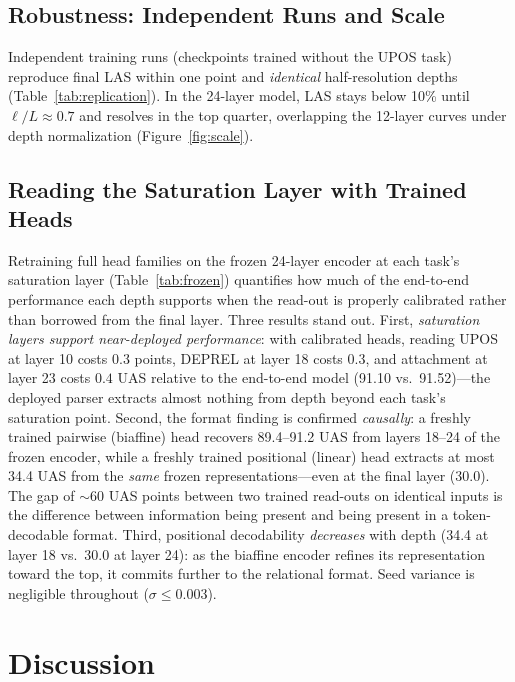 \documentclass[letterpaper]{article}
\begin{document}
\subsection{Robustness: Independent Runs and Scale}
Independent training runs (checkpoints trained without the UPOS task)
reproduce final LAS within one point and \emph{identical} half-resolution
depths (Table~\ref{tab:replication}). In the 24-layer model, LAS stays below
10\% until $\ell/L \approx 0.7$ and resolves in the top quarter, overlapping
the 12-layer curves under depth normalization (Figure~\ref{fig:scale}).

\subsection{Reading the Saturation Layer with Trained Heads}
\label{sec:frozen}
Retraining full head families on the frozen 24-layer encoder at each task's
saturation layer (Table~\ref{tab:frozen}) quantifies how much of the
end-to-end performance each depth supports when the read-out is properly
calibrated rather than borrowed from the final layer. Three results stand
out. First, \emph{saturation layers support near-deployed performance}: with
calibrated heads, reading UPOS at layer 10 costs $0.3$ points, DEPREL at
layer 18 costs $0.3$, and attachment at layer 23 costs $0.4$ UAS relative to
the end-to-end model (91.10 vs.\ 91.52)---the deployed parser extracts almost
nothing from depth beyond each task's saturation point. Second, the format
finding is confirmed \emph{causally}: a freshly trained pairwise (biaffine)
head recovers 89.4--91.2 UAS from layers 18--24 of the frozen encoder, while
a freshly trained positional (linear) head extracts at most 34.4 UAS from the
\emph{same} frozen representations---even at the final layer (30.0). The gap
of $\sim$60 UAS points between two trained read-outs on identical inputs is
the difference between information being present and being present in a
token-decodable format. Third, positional decodability \emph{decreases} with
depth (34.4 at layer 18 vs.\ 30.0 at layer 24): as the biaffine encoder
refines its representation toward the top, it commits further to the
relational format. Seed variance is negligible throughout
($\sigma \leq 0.003$).

\section{Discussion}
\end{document}
